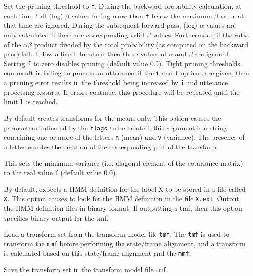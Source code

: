 \begin{optlist}
   Set the pruning threshold to {\tt f}.  During the 
      backward probability calculation, at
      each time $t$ 
      all (log) $\beta$ values falling more than {\tt f} below the
      maximum $\beta$ value at that time are ignored.  During the
      subsequent forward pass, (log) $\alpha$ values are only
      calculated if there are corresponding valid $\beta$ values.
      Furthermore, if the ratio of the $ \alpha \beta $ product divided
      by the total probability (as computed on the backward pass)
      falls below a fixed threshold then those values of $\alpha$
      and $\beta$ are ignored. Setting {\tt f} to zero disables
      pruning  (default value 0.0).  Tight pruning thresholds can
      result in  failing to process an utterance.
      if the {\tt i} and {\tt l} options are given, then a pruning
      error results in the threshold being increased by {\tt i} and
      utterance processing restarts.  If errors continue, this procedure will 
      be repeated until the limit {\tt l} is reached.
      
   By default  creates transforms for
      the means only. This option causes the parameters indicated by
      the {\tt flags} to be created; this argument is a string
      containing one or more of the letters {\tt m} (mean) and {\tt v}
      (variance). The presence of a letter
      enables the creation of the corresponding part of the transform.

    This sets the minimum variance (i.e. diagonal element of
      the covariance matrix) to the real value {\tt f} (default value
      0.0).
      
    By default,  expects a HMM definition for 
      the label X to be stored in a file called {\tt X}.  This
      option causes  to look for the HMM definition in the
      file {\tt X.ext}.
   Output the HMM definition files in binary format. If
      outputting a tmf, then this option specifies binary output for
      the tmf.

\stdoptF
\stdoptG
\stdoptH
\stdoptI

  Load a transform set from the transform model file
      {\tt tmf}. The {\tt tmf} is used to transform the {\tt mmf}
      before performing the state/frame alignment, and a transform is
      calculated based on this state/frame alignment and the {\tt mmf}.
      
   Save the transform set in the transform model file 
      {\tt tmf}.

\stdoptL
\stdoptM
\stdoptX

\end{optlist}

